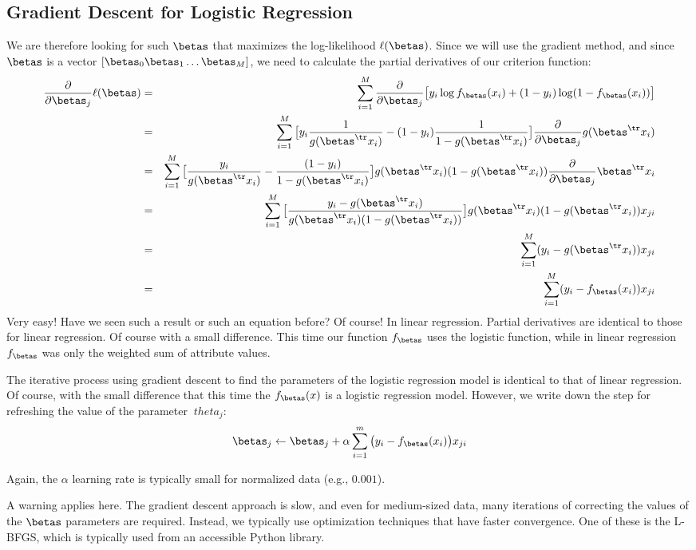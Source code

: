 \begin{refsection}
\section{Gradient Descent for Logistic Regression}
We are therefore looking for such $\betas$ that maximizes the log-likelihood $\ell(\betas)$. Since we will use the gradient method, and since $\betas$ is a vector $[\betas_0  \betas_1 \ldots \betas_M] $, we need to calculate the partial derivatives of our criterion function:
\begin{eqnarray}
  \frac{\partial}{\partial\betas_j}\ell(\betas)
  & = & \sum_{i=1}^M \frac{\partial}{\partial\betas_j} \big[y_i\log f_{\betas}(x_i)+(1-y_i)\log (1-f_{\betas}(x_i)) \big] \nonumber \\
  & = & \sum_{i=1}^M \big[y_i\frac{1}{g(\betas^\tr x_i)}-(1-y_i)\frac{1}{1-g(\betas^\tr x_i)} \big]\frac{\partial}{\partial\betas_j}g(\betas^\tr x_i) \nonumber\\
  & = & \sum_{i=1}^M \big[\frac{y_i}{g(\betas^\tr x_i)}-\frac{(1-y_i)}{1-g(\betas^\tr x_i)} \big]g(\betas^\tr x_i)(1-g(\betas^\tr x_i))
  \frac{\partial}{\partial\betas_j}\betas^\tr x_i\nonumber\\
  & = & \sum_{i=1}^M \big[\frac{y_i - g(\betas^\tr x_i)} {g(\betas^\tr x_i)(1-g(\betas^\tr x_i))} \big]g(\betas^\tr x_i)(1-g(\betas^\tr x_i)) x_{ji}\nonumber\\
  & = & \sum_{i=1}^M (y_i-g(\betas^\tr x_i))x_{ji}\nonumber\\
  & = & \sum_{i=1}^M (y_i-f_{\betas}(x_i))x_{ji}
  \label{eq:logreg-grad}
\end{eqnarray}
Very easy! Have we seen such a result or such an equation before? Of course! In linear regression. Partial derivatives are identical to those for linear regression. Of course with a small difference. This time our function $f_{\betas}$ uses the logistic function, while in linear regression $f_{\betas}$ was only the weighted sum of attribute values.

The iterative process using gradient descent to find the parameters of the logistic regression model is identical to that of linear regression. Of course, with the small difference that this time the $ f_{\betas}(x)$ is a logistic regression model. However, we write down the step for refreshing the value of the parameter $ \ theta_j $:
\begin{equation}
  \betas_j\leftarrow\betas_j+\alpha\sum_{i=1}^{m}\big(y_i-f_{\betas}(x_i)\big) x_{ji}
\end{equation}

Again, the $\alpha$ learning rate is typically small for normalized data (e.g., $0.001$).

A warning applies here. The gradient descent approach is slow, and even for medium-sized data, many iterations of correcting the values of the $\betas$ parameters are required. Instead, we typically use optimization techniques that have faster convergence. One of these is the L-BFGS, which is typically used from an accessible Python library.

\printbibliography[heading=subbibliography]
\end{refsection}